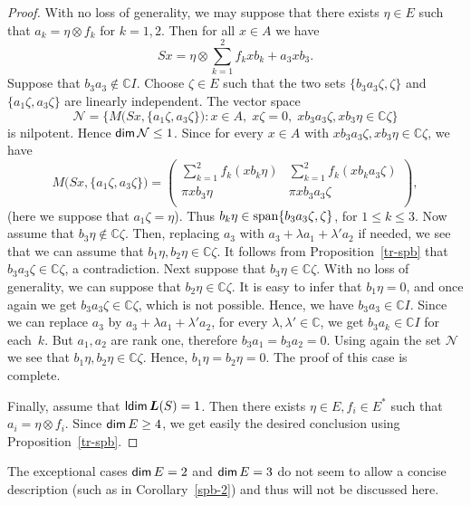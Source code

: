 \documentclass[a4paper,12pt,reqno]{amsart}
\numberwithin{equation}{section}
\theoremstyle{definition}
\begin{document}
\begin{proof}
With no loss of generality, we may suppose that there exists $\eta \in E$ such that $a_k= \eta \otimes f_k$ for $k=1,2$.  Then for all $x \in A$ we have
\begin{equation*}
Sx= \eta \otimes \sum_{k=1}^2f_kxb_k+a_3xb_3.
\end{equation*}
Suppose that $b_3a_3 \not\in {\mathbb{C}} I$. Choose $\zeta \in E$ such that the two sets  $\{b_3 a_3 \zeta, \zeta\}$
and $\{a_1 \zeta, a_3 \zeta\}$  are linearly independent. The vector space
\begin{equation*}
\mathcal N= \{M\bigl(Sx, \{a_1 \zeta, a_3 \zeta\}\bigr): x \in A,\; x \zeta=0, \;x b_3 a_3 \zeta, x b_3 \eta \in {\mathbb{C}} \zeta \}
\end{equation*}
is nilpotent. Hence ${{\sf dim}\,} \mathcal N \leq 1$.  Since for every  $x \in A$ with  $x b_3 a_3 \zeta, x b_3 \eta \in {\mathbb{C}} \zeta$, we have
\begin{equation*}
M\bigl(Sx, \{a_1 \zeta, a_3 \zeta\}\bigr)= \left(
                                    \begin{array}{cc}
                                      \sum_{k=1}^2f_k(xb_k \eta) & \sum_{k=1}^2f_k(xb_k a_3 \zeta) \\
                                      \pi x b_3 \eta & \pi x b_3 a_3 \zeta \\
                                    \end{array}
                                  \right),
\end{equation*}
(here we suppose that $a_1 \zeta= \eta$).
Thus $b_k \eta \in {{\rm span}} \{b_3a_3 \zeta, \zeta\}$, for $ 1 \leq k \leq 3$.
Now assume that $b_3 \eta \not\in {\mathbb{C}} \zeta$. Then, replacing $a_3$ with $a_3+ \lambda a_1+ \lambda' a_2$ if needed,
we see that we  can assume that $b_1 \eta, b_2 \eta \in {\mathbb{C}} \zeta$. It follows from Proposition~\ref{tr-spb}
that $b_3a_3 \zeta \in {\mathbb{C}} \zeta$, a contradiction. Next suppose that $b_3 \eta \in {\mathbb{C}} \zeta$.
With no loss of generality, we can suppose that $b_2 \eta \in {\mathbb{C}} \zeta$. It is easy to infer that $b_1 \eta=0$,
and once again we get $b_3 a_3 \zeta \in {\mathbb{C}} \zeta$, which is not possible. Hence,  we have $b_3 a_3\in {\mathbb{C}} I$. Since we can replace
$a_3$ by $a_3+ \lambda a_1+ \lambda' a_2$, for every $\lambda, \lambda' \in {\mathbb{C}}$, we get $b_3 a_k \in {\mathbb{C}} I$ for each~$k$.
But $a_1, a_2$ are rank one, therefore $b_3a_1=b_3a_2=0$.  Using again the set $\mathcal N$ we see that
$b_1 \eta, b_2 \eta \in {\mathbb{C}} \zeta$. Hence, $b_1 \eta= b_2 \eta=0$. The proof of this case is complete.

\smallskip
Finally, assume that ${{\sf ldim}\,} {{\bm L(S)}}=1$.   Then there exists $\eta \in E, f_i \in E^*$ such that $a_i=\eta \otimes f_i$.
Since ${{\sf dim}\,} E \geq 4$, we get easily the desired conclusion using Proposition~\ref{tr-spb}.
\end{proof}
The exceptional cases ${{\sf dim}\,} E=2$ and ${{\sf dim}\,} E=3$ do not seem to allow a concise description (such as in Corollary~\ref{spb-2})
and thus will not be discussed here.
\end{document}
